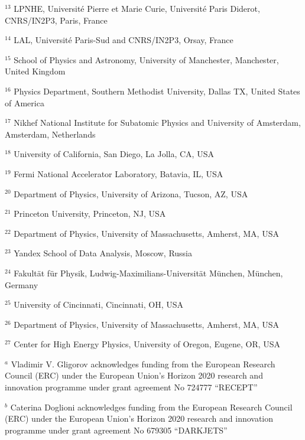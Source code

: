\par {\footnotesize $^{13}$ LPNHE, Université Pierre et Marie Curie, Université Paris Diderot, CNRS/IN2P3, Paris, France}
\par {\footnotesize $^{14}$ LAL, Université Paris-Sud and CNRS/IN2P3, Orsay, France}
\par {\footnotesize $^{15}$ School of Physics and Astronomy, University of Manchester, Manchester, United Kingdom}
\par {\footnotesize $^{16}$ Physics Department, Southern Methodist University, Dallas TX, United States of America}
\par {\footnotesize $^{17}$ Nikhef National Institute for Subatomic Physics and University of Amsterdam, Amsterdam, Netherlands}
\par {\footnotesize $^{18}$ University of California, San Diego, La Jolla, CA, USA}
\par {\footnotesize $^{19}$ Fermi National Accelerator Laboratory, Batavia, IL, USA}
\par {\footnotesize $^{20}$ Department of Physics, University of Arizona, Tucson, AZ, USA}
\par {\footnotesize $^{21}$ Princeton University, Princeton, NJ, USA}
\par {\footnotesize $^{22}$ Department of Physics, University of Massachusetts, Amherst, MA, USA}
\par {\footnotesize $^{23}$ Yandex School of Data Analysis, Moscow, Russia}
\par {\footnotesize $^{24}$ Fakultät für Physik, Ludwig-Maximilians-Universität München, München, Germany}
\par {\footnotesize $^{25}$ University of Cincinnati, Cincinnati, OH, USA}
\par {\footnotesize $^{26}$ Department of Physics, University of Massachusetts, Amherst, MA, USA}
\par {\footnotesize $^{27}$ Center for High Energy Physics, University of Oregon, Eugene, OR, USA}
\bigskip
\par {\footnotesize $^{a}$ Vladimir V. Gligorov acknowledges funding from the European Research Council (ERC) under the European Union's Horizon 2020 research and innovation programme under grant agreement No 724777 “RECEPT”}
\par {\footnotesize $^{b}$ Caterina Doglioni acknowledges funding from the European Research Council (ERC) under the European Union's Horizon 2020 research and innovation programme under grant agreement No 679305 “DARKJETS”}
